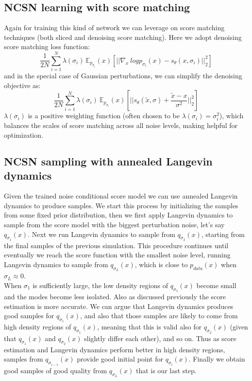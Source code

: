 \documentclass{article}
\begin{document}
    \subsection{NCSN learning with score matching}
    Again for training this kind of network we can leverage on score matching techniques (both sliced and denoising score matching). Here we adopt denoising score matching loss function:
    \begin{equation}
    \frac{1}{2N} \sum_{i=1}^{N} \lambda(\sigma_{i})\ \mathbb{E}_{p_{\sigma_{i}}}(x) [ || \nabla_{x}\ log {p_{\sigma_{i}}} (x) - s_{\theta}(x,\sigma_{i}) ||_{2}^{2}]
     \end{equation}
     and in the special case of Gaussian perturbations, we can simplify the denoising objective as:
     \begin{equation}
      \frac{1}{2N} \sum_{i=1}^{N} \lambda(\sigma_{i})\ \mathbb{E}_{p_{\sigma_{i}}}(x)[|| s_{\theta}(\tilde{x},\sigma)+ \frac{\tilde{x}-x}{\sigma^{2}}||_{2}^{2}]
     \end{equation}
     $\lambda(\sigma_{i})$ is a positive weighting function (often chosen to be $ \lambda(\sigma_{i}) = \sigma_{i}^{2} $), which balances the scales of score matching across all noise levels, making helpful for optimization.
     \subsection{NCSN sampling with annealed Langevin dynamics}
     Given the trained noise conditional score model we can use annealed Langevin dynamics to produce samples. We start this process by initializing the samples from some fixed prior distribution, then we first apply Langevin dynamics to sample from the score model with the biggest perturbation noise, let's say $q_{\sigma_{1}}(x)$. Next we run Langevin dynamics to sample from $q_{\sigma_{2}}(x)$, starting from the final samples of the previous simulation. This procedure continues until eventually we reach the score function with the smallest noise level, running Langevin dynamics to sample from $q_{\sigma_{L}}(x)$, which is close to $p_{data}(x)$ when $\sigma_{L} \approx 0$.\\
     \newline
     When $\sigma_{1}$ is sufficiently large, the low density regions of $q_{\sigma_{1}}(x)$ become small and the modes become less isolated. Also as discussed previously the score estimation is more accurate. We can argue that Langevin dynamics produces good samples for $q_{\sigma_{1}}(x)$, and also that those samples are likely to come from high density regions of $q_{\sigma_{1}}(x)$, meaning that this is valid also for $q_{\sigma_{2}}(x)$ (given that $q_{\sigma_{1}}(x)$ and $q_{\sigma_{2}}(x)$ slightly differ each other), and so on. Thus as score estimation and Langevin dynamics perform better in high density regions, samples from $q_{\sigma_{i-1}}(x)$ provide good initial point for $q_{\sigma_{i}}(x)$. Finally we obtain good samples of good quality from $q_{\sigma_{L}}(x)$ that is our last step.
     \newpage
\end{document}
